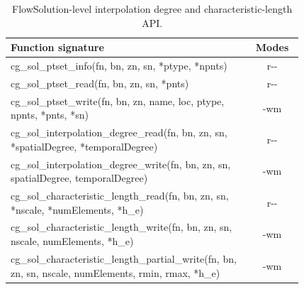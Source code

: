 \documentclass[11pt,letterpaper]{article}
\newif\ifvfourdraft
\newcommand{\vfour}[1]{\ifvfourdraft\textcolor{v4violet}{#1}\else#1\fi}
\begin{document}
\begin{table}[htbp]
\centering
\small
{}
\begin{tabular}{@{} >{\raggedright\ttfamily\small}p{0.82\linewidth} c @{}}
\toprule
\textbf{\normalfont Function signature} & \textbf{\normalfont Modes} \\
\midrule
cg\_sol\_ptset\_info(fn, bn, zn, sn, *ptype, *npnts) & r{-}{-} \\
cg\_sol\_ptset\_read(fn, bn, zn, sn, *pnts) & r{-}{-} \\
cg\_sol\_ptset\_write(fn, bn, zn, name, loc, ptype, npnts, *pnts, *sn) & {-}wm \\
\addlinespace
cg\_sol\_interpolation\_degree\_read(fn, bn, zn, sn, *spatialDegree, *temporalDegree) & r{-}{-} \\
cg\_sol\_interpolation\_degree\_write(fn, bn, zn, sn, spatialDegree, temporalDegree) & {-}wm \\
\addlinespace
cg\_sol\_characteristic\_length\_read(fn, bn, zn, sn, *nscale, *numElements, *h\_e) & r{-}{-} \\
cg\_sol\_characteristic\_length\_write(fn, bn, zn, sn, nscale, numElements, *h\_e) & {-}wm \\
\vfour{cg\_sol\_characteristic\_length\_partial\_write(fn, bn, zn, sn, nscale, numElements, rmin, rmax, *h\_e)} & \vfour{{-}wm} \\
\bottomrule
\end{tabular}
\caption{FlowSolution-level interpolation degree and characteristic-length API.}
\label{tab:sol-api}
\end{table}
\end{document}
